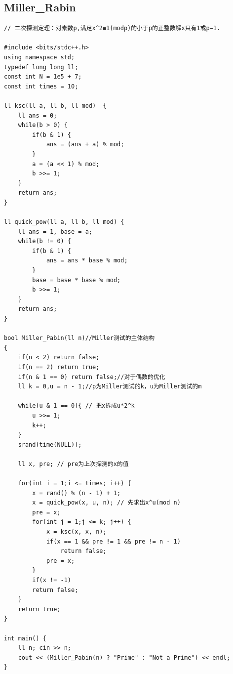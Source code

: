 \documentclass[twoside]{article}
\begin{document}
\subsection{Miller_Rabin}
\begin{lstlisting}
// 二次探测定理：对素数p,满足x^2≡1(modp)的小于p的正整数解x只有1或p−1.

#include <bits/stdc++.h>
using namespace std;
typedef long long ll;
const int N = 1e5 + 7;
const int times = 10;

ll ksc(ll a, ll b, ll mod)  {
    ll ans = 0;
    while(b > 0) {
        if(b & 1) {
            ans = (ans + a) % mod;
        }
        a = (a << 1) % mod;
        b >>= 1;
    }
    return ans;
}

ll quick_pow(ll a, ll b, ll mod) {
    ll ans = 1, base = a;
    while(b != 0) {
        if(b & 1) {
            ans = ans * base % mod;
        }
        base = base * base % mod;
        b >>= 1;
    }
    return ans;
}

bool Miller_Pabin(ll n)//Miller测试的主体结构
{
    if(n < 2) return false;
    if(n == 2) return true;
    if(n & 1 == 0) return false;//对于偶数的优化
    ll k = 0,u = n - 1;//p为Miller测试的k，u为Miller测试的m
    
    while(u & 1 == 0){ // 把x拆成u*2^k
        u >>= 1;
        k++;
    }
    srand(time(NULL));

    ll x, pre; // pre为上次探测的x的值

    for(int i = 1;i <= times; i++) {
        x = rand() % (n - 1) + 1;
        x = quick_pow(x, u, n); // 先求出x^u(mod n)
        pre = x;
        for(int j = 1;j <= k; j++) {
            x = ksc(x, x, n);
            if(x == 1 && pre != 1 && pre != n - 1)
                return false;
            pre = x;
        }
        if(x != -1)
        return false;
    }
    return true;
}
 
int main() {
    ll n; cin >> n;
    cout << (Miller_Pabin(n) ? "Prime" : "Not a Prime") << endl;
}\end{lstlisting}
\end{document}
